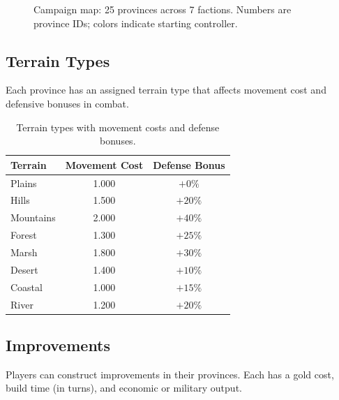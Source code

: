 \documentclass[a4paper, 11pt]{article}
\begin{document}
\begin{figure}[htbp]
\caption{Campaign map: 25 provinces across 7 factions. Numbers are province IDs;
  colors indicate starting controller.}
\label{fig:map}
\end{figure}

\subsection{Terrain Types}

Each province has an assigned terrain type that affects movement cost and
defensive bonuses in combat.

\begin{table}[htbp]
\centering
\caption{Terrain types with movement costs and defense bonuses.}
\label{tab:terrain}
\begin{tabular}{@{}lcc@{}}
\toprule
\textbf{Terrain} & \textbf{Movement Cost} & \textbf{Defense Bonus} \\
\midrule
Plains    & 1.000 & $+0\%$  \\
Hills     & 1.500 & $+20\%$ \\
Mountains & 2.000 & $+40\%$ \\
Forest    & 1.300 & $+25\%$ \\
Marsh     & 1.800 & $+30\%$ \\
Desert    & 1.400 & $+10\%$ \\
Coastal   & 1.000 & $+15\%$ \\
River     & 1.200 & $+20\%$ \\
\bottomrule
\end{tabular}
\end{table}

\subsection{Improvements}

Players can construct improvements in their provinces. Each has a gold cost,
build time (in turns), and economic or military output.
\end{document}
